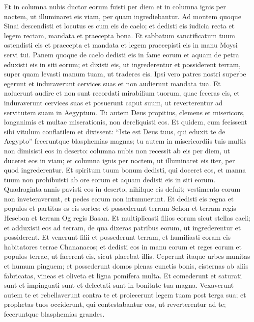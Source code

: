 \begin{biblechapter}
\verse Et in columna nubis ductor eorum fuisti per diem et in columna ignis per noctem, ut illuminaret eis viam, per quam ingrediebantur. 
\verse Ad montem quoque Sinai descendisti et locutus es cum eis de caelo; et dedisti eis iudicia recta et legem rectam, mandata et praecepta bona. 
\verse Et sabbatum sanctificatum tuum ostendisti eis et praecepta et mandata et legem praecepisti eis in manu Moysi servi tui. 
\verse Panem quoque de caelo dedisti eis in fame eorum et aquam de petra eduxisti eis in siti eorum; et dixisti eis, ut ingrederentur et possiderent terram, super quam levasti manum tuam, ut traderes eis. 
\verse Ipsi vero patres nostri superbe egerunt et induraverunt cervices suas et non audierunt mandata tua. 
\verse Et noluerunt audire et non sunt recordati mirabilium tuorum, quae feceras eis, et induraverunt cervices suas et posuerunt caput suum, ut reverterentur ad servitutem suam in Aegyptum. Tu autem Deus propitius, clemens et misericors, longanimis et multae miserationis, non dereliquisti eos. 
\verse Et quidem, cum fecissent sibi vitulum conflatilem et dixissent: “Iste est Deus tuus, qui eduxit te de Aegypto” feceruntque blasphemias magnas; 
\verse tu autem in misericordiis tuis multis non dimisisti eos in deserto: columna nubis non recessit ab eis per diem, ut duceret eos in viam; et columna ignis per noctem, ut illuminaret eis iter, per quod ingrederentur. 
\verse Et spiritum tuum bonum dedisti, qui doceret eos, et manna tuum non prohibuisti ab ore eorum et aquam dedisti eis in siti eorum. 
\verse Quadraginta annis pavisti eos in deserto, nihilque eis defuit; vestimenta eorum non inveteraverunt, et pedes eorum non intumuerunt. 
\verse Et dedisti eis regna et populos et partitus es eis sortes; et possederunt terram Sehon et terram regis Hesebon et terram Og regis Basan. 
\verse Et multiplicasti filios eorum sicut stellas caeli; et adduxisti eos ad terram, de qua dixeras patribus eorum, ut ingrederentur et possiderent. 
\verse Et venerunt filii et possederunt terram, et humiliasti coram eis habitatores terrae Chananaeos; et dedisti eos in manu eorum et reges eorum et populos terrae, ut facerent eis, sicut placebat illis. 
\verse Ceperunt itaque urbes munitas et humum pinguem; et possederunt domos plenas cunctis bonis, cisternas ab aliis fabricatas, vineas et oliveta et ligna pomifera multa. Et comederunt et saturati sunt et impinguati sunt et delectati sunt in bonitate tua magna. 
\verse Vexaverunt autem te et rebellaverunt contra te et proiecerunt legem tuam post terga sua; et prophetas tuos occiderunt, qui contestabantur eos, ut reverterentur ad te; feceruntque blasphemias grandes. 

\end{biblechapter}
